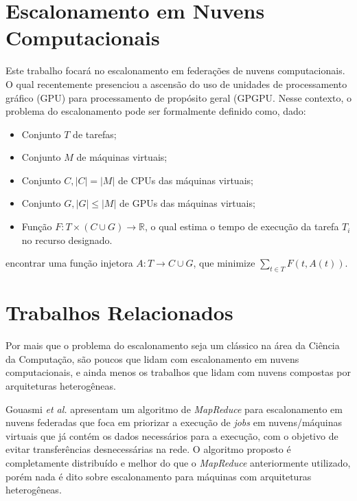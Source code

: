 \section{Escalonamento em Nuvens Computacionais}

Este trabalho focará no escalonamento em federações de nuvens computacionais. O qual recentemente presenciou a ascensão do uso de unidades de processamento gráfico (\acrfull{GPU}) para processamento de propósito geral (\acrfull{GPGPU}\cite{Dimitrov:2009:USA:1513895.1513907}\cite{Yang:2010:GCM:1809028.1806606}. Nesse contexto, o problema do escalonamento pode ser formalmente definido como, dado:\\

\begin{itemize}
	\item Conjunto $T$ de tarefas;
	\item Conjunto $M$ de máquinas virtuais;
	\item Conjunto $C, |C| = |M|$ de CPUs das máquinas virtuais;
	\item Conjunto $G,  |G| \le |M|$ de GPUs das máquinas virtuais;
	\item Função $F: T \times (C \cup G) \to \mathbb{R}$, o qual estima o tempo de execução da tarefa $T_{i}$ no recurso designado.
\end{itemize}
encontrar uma função injetora $A: T \to C \cup G$, que minimize $\sum_{t \in T} F(t, A(t) )$.\\

\section{Trabalhos Relacionados}

Por mais que o problema do escalonamento seja um clássico na área da Ciência da Computação, são poucos que lidam com escalonamento em nuvens computacionais, e ainda menos os trabalhos que lidam com nuvens compostas por arquiteturas heterogêneas. 

Gouasmi \textit{et al.} \cite{MapReduce_sched_8034997} apresentam um algoritmo de \textit{MapReduce}\cite{Dean:2008:MSD:1327452.1327492} para escalonamento em nuvens federadas que foca em priorizar a execução de \textit{jobs} em nuvens/máquinas virtuais que já contém os dados necessários para a execução, com o objetivo de evitar transferências desnecessárias na rede. O algoritmo proposto é completamente distribuído e melhor do que o \textit{MapReduce} anteriormente utilizado, porém nada é dito sobre escalonamento para máquinas com arquiteturas heterogêneas.

